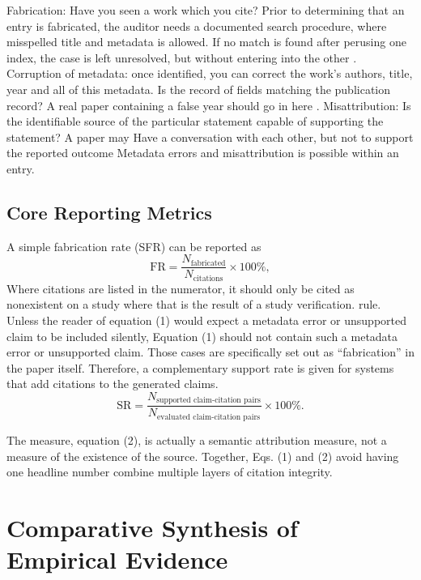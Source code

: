 \documentclass[acmsmall,screen,nonacm]{acmart}
\begin{document}
Fabrication: Have you seen a work which you cite? Prior to determining that an entry is fabricated, the auditor needs a documented search procedure, where misspelled title and metadata is allowed. If no match is found after perusing one index, the case is left unresolved, but without entering into the other \cite{ref22}. Corruption of metadata: once identified, you can correct the work’s authors, title, year and all of this metadata. Is the record of fields matching the publication record? A real paper containing a false year should go in here \cite{ref2,ref17}. Misattribution: Is the identifiable source of the particular statement capable of supporting the statement? A paper may Have a conversation with each other, but not to support the reported outcome \cite{ref13,ref23} Metadata errors and misattribution is possible within an entry.

\subsection{Core Reporting Metrics}

A simple fabrication rate (SFR) can be reported as
\begin{equation}\mathrm{FR}=\frac{N_{\mathrm{fabricated}}}{N_{\mathrm{citations}}}\times100\%,\end{equation}
Where citations are listed in the numerator, it should only be cited as nonexistent on a study where that is the result of a study verification. rule. Unless the reader of equation (1) would expect a metadata error or unsupported claim to be included silently, Equation (1) should not contain such a metadata error or unsupported claim. Those cases are specifically set out as “fabrication” in the paper itself. Therefore, a complementary support rate is given for systems that add citations to the generated claims.
\begin{equation}\mathrm{SR}=\frac{N_{\text{supported claim-citation pairs}}}{N_{\text{evaluated claim-citation pairs}}}\times100\%.\end{equation}

The measure, equation (2), is actually a semantic attribution measure, not a measure of the existence of the source. Together, Eqs. (1) and (2) avoid having one headline number combine multiple layers of citation integrity.

\section{Comparative Synthesis of Empirical Evidence}
\end{document}
